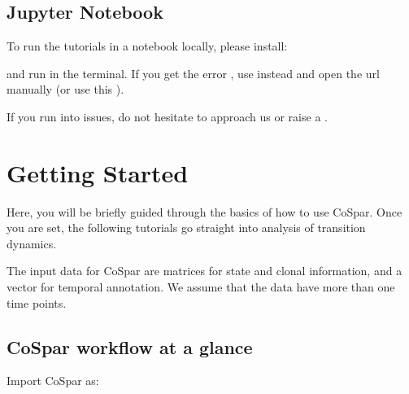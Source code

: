 \documentclass[letterpaper,10pt,english]{sphinxmanual}
\begin{document}
\subsection{Jupyter Notebook}
\label{\detokenize{installation:jupyter-notebook}}
To run the tutorials in a notebook locally, please install:

\begin{sphinxVerbatim}[commandchars=\\\{\}]
  
\end{sphinxVerbatim}

and run  in the terminal. If you get the error ,
use  instead and open the url manually (or use this
).

If you run into issues, do not hesitate to approach us or raise a .


\section{Getting Started}
\label{\detokenize{getting_started:getting-started}}\label{\detokenize{getting_started::doc}}
Here, you will be briefly guided through the basics of how to use CoSpar.
Once you are set, the following tutorials go straight into analysis of transition dynamics.

The input data for CoSpar are matrices for state and clonal information, and a vector for temporal annotation. We assume that the data have more than one time points.


\subsection{CoSpar workflow at a glance}
\label{\detokenize{getting_started:cospar-workflow-at-a-glance}}
Import CoSpar as:

\begin{sphinxVerbatim}[commandchars=\\\{\}]
   
\end{sphinxVerbatim}
\end{document}
